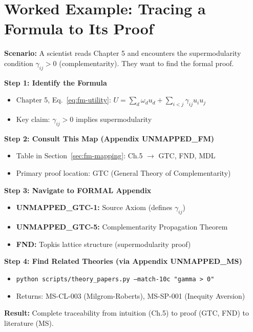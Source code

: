 \section{Worked Example: Tracing a Formula to Its Proof}
\label{sec:fm-example}

\begin{tcolorbox}[colback=green!5!white, colframe=green!75!black,
    title=\textbf{Worked Example: From Chapter 5 to Formal Proof}]

\textbf{Scenario:} A scientist reads Chapter 5 and encounters the supermodularity condition
$\gamma_{ij} > 0$ (complementarity). They want to find the formal proof.

\textbf{Step 1: Identify the Formula}
\begin{itemize}[nosep]
    \item Chapter 5, Eq.~\ref{eq:fm-utility}: $U = \sum_d \omega_d u_d + \sum_{i<j} \gamma_{ij} u_i u_j$
    \item Key claim: $\gamma_{ij} > 0$ implies supermodularity
\end{itemize}

\textbf{Step 2: Consult This Map (Appendix UNMAPPED_FM)}
\begin{itemize}[nosep]
    \item Table in Section~\ref{sec:fm-mapping}: Ch.5 $\rightarrow$ GTC, FND, MDL
    \item Primary proof location: GTC (General Theory of Complementarity)
\end{itemize}

\textbf{Step 3: Navigate to FORMAL Appendix}
\begin{itemize}[nosep]
    \item \textbf{UNMAPPED_GTC-1:} Source Axiom (defines $\gamma_{ij}$)
    \item \textbf{UNMAPPED_GTC-5:} Complementarity Propagation Theorem
    \item \textbf{FND:} Topkis lattice structure (supermodularity proof)
\end{itemize}

\textbf{Step 4: Find Related Theories (via Appendix UNMAPPED_MS)}
\begin{itemize}[nosep]
    \item \texttt{python scripts/theory\_papers.py --match-10c "gamma > 0"}
    \item Returns: MS-CL-003 (Milgrom-Roberts), MS-SP-001 (Inequity Aversion)
\end{itemize}

\textbf{Result:} Complete traceability from intuition (Ch.5) to proof (GTC, FND) to literature (MS).

\end{tcolorbox}

